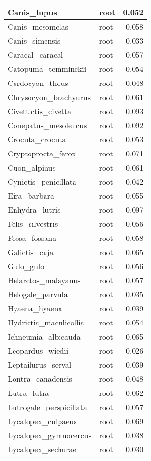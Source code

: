 \begin{table}
\begin{tabular}[t]{l|l|r}
\hline
Canis\_lupus & root & 0.052\\
\hline
Canis\_mesomelas & root & 0.058\\
\hline
Canis\_simensis & root & 0.033\\
\hline
Caracal\_caracal & root & 0.057\\
\hline
Catopuma\_temminckii & root & 0.054\\
\hline
Cerdocyon\_thous & root & 0.048\\
\hline
Chrysocyon\_brachyurus & root & 0.061\\
\hline
Civettictis\_civetta & root & 0.093\\
\hline
Conepatus\_mesoleucus & root & 0.092\\
\hline
Crocuta\_crocuta & root & 0.053\\
\hline
Cryptoprocta\_ferox & root & 0.071\\
\hline
Cuon\_alpinus & root & 0.061\\
\hline
Cynictis\_penicillata & root & 0.042\\
\hline
Eira\_barbara & root & 0.055\\
\hline
Enhydra\_lutris & root & 0.097\\
\hline
Felis\_silvestris & root & 0.056\\
\hline
Fossa\_fossana & root & 0.058\\
\hline
Galictis\_cuja & root & 0.065\\
\hline
Gulo\_gulo & root & 0.056\\
\hline
Helarctos\_malayanus & root & 0.057\\
\hline
Helogale\_parvula & root & 0.035\\
\hline
Hyaena\_hyaena & root & 0.039\\
\hline
Hydrictis\_maculicollis & root & 0.054\\
\hline
Ichneumia\_albicauda & root & 0.065\\
\hline
Leopardus\_wiedii & root & 0.026\\
\hline
Leptailurus\_serval & root & 0.039\\
\hline
Lontra\_canadensis & root & 0.048\\
\hline
Lutra\_lutra & root & 0.062\\
\hline
Lutrogale\_perspicillata & root & 0.057\\
\hline
Lycalopex\_culpaeus & root & 0.069\\
\hline
Lycalopex\_gymnocercus & root & 0.038\\
\hline
Lycalopex\_sechurae & root & 0.030\\

\end{tabular}
\end{table}
